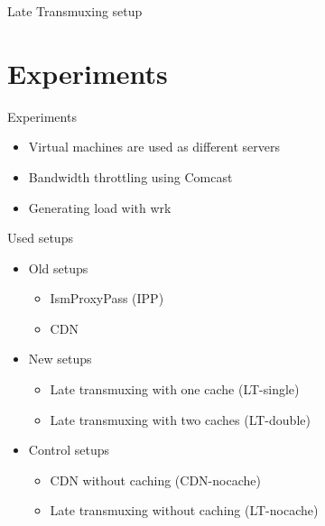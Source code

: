 \documentclass[xcolor=svgnames]{beamer}
\begin{document}
\begin{frame}{Late Transmuxing setup}
    \begin{figure}

        \resizebox*{!}{\dimexpr\textheight-2\baselineskip\relax}{%
            
        }
    \end{figure}

\end{frame}


\section{Experiments}
\begin{frame}{Experiments}
    \begin{itemize}
        \item Virtual machines are used as different servers
        \item Bandwidth throttling using Comcast
        \item Generating load with wrk
    \end{itemize}
\end{frame}

\begin{frame}{Used setups}
    \begin{itemize}
        \item Old setups
            \begin{itemize}
                \item IsmProxyPass (IPP)
                \item CDN
            \end{itemize}

        \item New setups
            \begin{itemize}
                \item Late transmuxing with one cache (LT-single)
                \item Late transmuxing with two caches (LT-double)
            \end{itemize}
        \item Control setups
            \begin{itemize}
                \item CDN without caching (CDN-nocache)
                \item Late transmuxing without caching (LT-nocache)
            \end{itemize}
    \end{itemize}
\end{frame}
\end{document}
